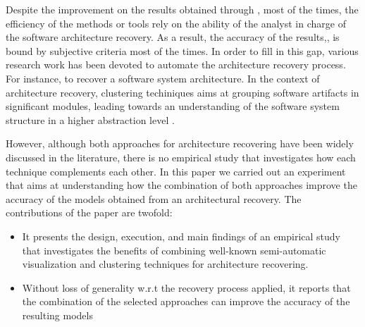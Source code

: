 Despite the improvement on the results obtained through , most of the times, 
the efficiency of the methods or tools rely on the ability of the analyst in charge of the software architecture recovery. As a result, the accuracy of the results,, is bound by subjective criteria most of the times. In order to fill in this gap, various research work has been devoted to automate the architecture recovery process. For instance,  to recover a software system architecture\cite{shtern_clustering_2012, Jain_Murty_1999, Wiggerts, mitchell_heuristic_2002}. 
In the context of architecture recovery, clustering techiniques aims at grouping software artifacts in significant modules, leading towards an understanding of 
the software system structure in a higher abstraction level \cite{shtern_clustering_2012}.

However, although both approaches for architecture recovering have been widely discussed in the literature, there is no empirical study that investigates how each technique complements each other. In this paper we carried out an experiment that aims at understanding how the combination of both approaches improve the accuracy of the models obtained from an architectural recovery. The contributions of the paper are twofold:
\begin{itemize}
\item It presents the design, execution, and main findings of an empirical study that 
investigates the benefits of combining well-known semi-automatic visualization and clustering techniques for architecture recovering. 
\item Without loss of generality w.r.t the recovery process applied, it reports that the combination of the selected approaches can improve the accuracy of the resulting models    
\end{itemize}


